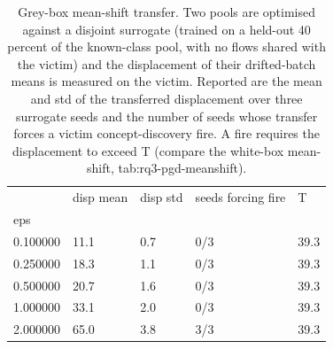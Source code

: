 \begin{table}
\caption{Grey-box mean-shift transfer. Two pools are optimised against a disjoint surrogate (trained on a held-out 40 percent of the known-class pool, with no flows shared with the victim) and the displacement of their drifted-batch means is measured on the victim. Reported are the mean and std of the transferred displacement over three surrogate seeds and the number of seeds whose transfer forces a victim concept-discovery fire. A fire requires the displacement to exceed T (compare the white-box mean-shift, tab:rq3-pgd-meanshift).}
\label{tab:rq3-pgd-meanshift-greybox}
\begin{tabular}{lllll}
\toprule
 & disp mean & disp std & seeds forcing fire & T \\
eps &  &  &  &  \\
\midrule
0.100000 & 11.1 & 0.7 & 0/3 & 39.3 \\
0.250000 & 18.3 & 1.1 & 0/3 & 39.3 \\
0.500000 & 20.7 & 1.6 & 0/3 & 39.3 \\
1.000000 & 33.1 & 2.0 & 0/3 & 39.3 \\
2.000000 & 65.0 & 3.8 & 3/3 & 39.3 \\
\bottomrule
\end{tabular}
\end{table}
